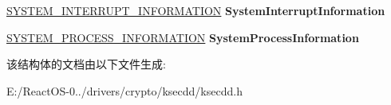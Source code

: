 \begin{DoxyCompactItemize}
\item 
\mbox{\label{struct___k_s_e_c___e_n_t_r_o_p_y___d_a_t_a_ab9b1d9cddfe24879041cdbf4afd6cf2b}} 
\hyperlink{struct___s_y_s_t_e_m___i_n_t_e_r_r_u_p_t___i_n_f_o_r_m_a_t_i_o_n}{S\+Y\+S\+T\+E\+M\+\_\+\+I\+N\+T\+E\+R\+R\+U\+P\+T\+\_\+\+I\+N\+F\+O\+R\+M\+A\+T\+I\+ON} {\bfseries System\+Interrupt\+Information}
\item 
\mbox{\label{struct___k_s_e_c___e_n_t_r_o_p_y___d_a_t_a_a016ab5e75d15352e9e283734b1f0823e}} 
\hyperlink{struct___s_y_s_t_e_m___p_r_o_c_e_s_s___i_n_f_o_r_m_a_t_i_o_n}{S\+Y\+S\+T\+E\+M\+\_\+\+P\+R\+O\+C\+E\+S\+S\+\_\+\+I\+N\+F\+O\+R\+M\+A\+T\+I\+ON} {\bfseries System\+Process\+Information}
\end{DoxyCompactItemize}


该结构体的文档由以下文件生成\+:\begin{DoxyCompactItemize}
\item 
E\+:/\+React\+O\+S-\/0../drivers/crypto/ksecdd/ksecdd.\+h\end{DoxyCompactItemize}
